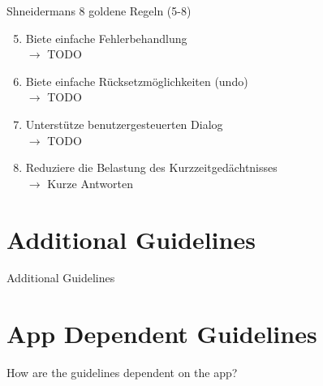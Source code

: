 \documentclass[
  10pt
, handout
]{beamer}
\begin{document}
\begin{frame}{Shneidermans 8 goldene Regeln (5-8)}
  \begin{enumerate}
    \setcounter{enumi}{4}
    \item<+-> Biete einfache Fehlerbehandlung \\ $\rightarrow$ TODO
    \item<+-> Biete einfache Rücksetzmöglichkeiten (undo) \\ $\rightarrow$ TODO
    \item<+-> Unterstütze benutzergesteuerten Dialog \\ $\rightarrow$ TODO
    \item<+-> Reduziere die Belastung des Kurzzeitgedächtnisses \\ $\rightarrow$ Kurze Antworten
  \end{enumerate}
\end{frame}

\section{Additional Guidelines}  %

\begin{frame}{Additional Guidelines}
\end{frame}

\section{App Dependent Guidelines}  %

\begin{frame}{How are the guidelines dependent on the app?}
\end{frame}
\end{document}
